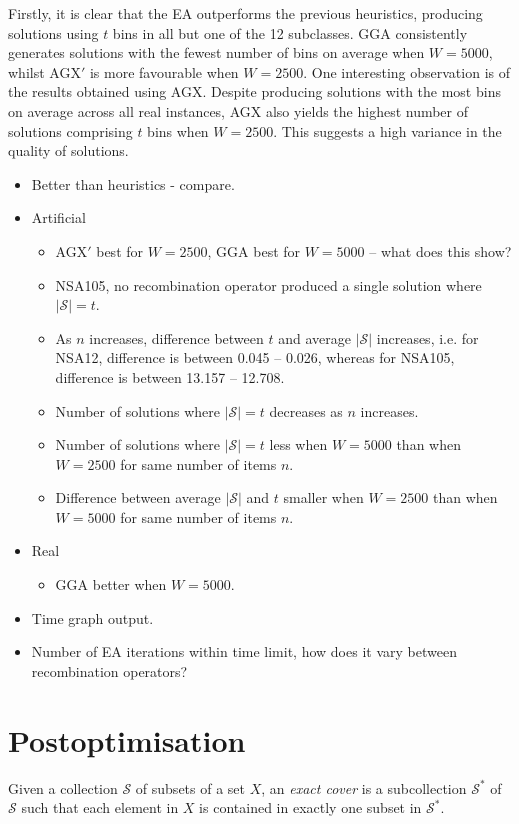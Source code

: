 \documentclass[authoryear]{elsarticle}
\begin{document}
\noindent Firstly, it is clear that the EA outperforms the previous heuristics, producing solutions using $t$ bins in all but one of the 12 subclasses. GGA consistently generates solutions with the fewest number of bins on average when $W=5000$, whilst AGX$'$ is more favourable when $W=2500$. One interesting observation is of the results obtained using AGX. Despite producing solutions with the most bins on average across all real instances, AGX also yields the highest number of solutions comprising $t$ bins when $W=2500$. This suggests a high variance in the quality of solutions.

{\color{myRed}
\begin{itemize}[leftmargin=*]
	\item Better than heuristics - compare.
	\item Artificial
	\begin{itemize}
		\item AGX$'$ best for $W=2500$, GGA best for $W=5000$ -- what does this show?
		\item NSA105, no recombination operator produced a single solution where $|\mathcal{S}| = t$.
		\item As $n$ increases, difference between $t$ and average $|\mathcal{S}|$ increases, i.e. for NSA12, difference is between 0.045 -- 0.026, whereas for NSA105, difference is between 13.157 -- 12.708.
		\item Number of solutions where $|\mathcal{S}| = t$ decreases as $n$ increases.
		\item Number of solutions where $|\mathcal{S}| = t$ less when $W=5000$ than when $W=2500$ for same number of items $n$.
		\item Difference between average $|\mathcal{S}|$ and $t$ smaller when $W=2500$ than when $W=5000$ for same number of items $n$.
	\end{itemize}
	\item Real
	\begin{itemize}
		\item GGA better when $W=5000$.
	\end{itemize}	
	\item Time graph output.
	\item Number of EA iterations within time limit, how does it vary between recombination operators?
\end{itemize}
}

\section{Postoptimisation}
\label{sec:postopt}
\noindent Given a collection $\mathcal{S}$ of subsets of a set $X$, an \emph{exact cover} is a subcollection $\mathcal{S}^*$ of $\mathcal{S}$ such that each element in $X$ is contained in exactly one subset in $\mathcal{S}^*$.
\end{document}
